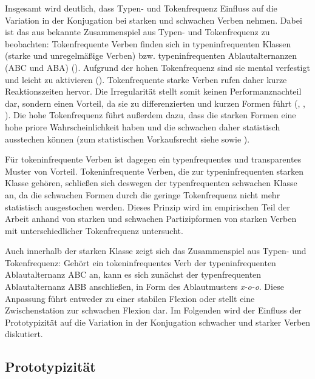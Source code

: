 Insgesamt wird deutlich, dass Typen- und Tokenfrequenz Einfluss auf die Variation in der Konjugation bei starken und schwachen Verben nehmen. Dabei ist das aus  bekannte Zusammenspiel aus Typen- und Tokenfrequenz zu beobachten: Tokenfrequente Verben finden sich in typeninfrequenten Klassen (starke und unregelmäßige Verben) bzw. typeninfrequenten Ablautalternanzen (ABC und ABA) (\cite[40--41]{Werner.1989}). Aufgrund der hohen Tokenfrequenz sind sie mental verfestigt und leicht zu aktivieren (\cite[380]{Bybee.1997}). Tokenfrequente starke Verben rufen daher kurze Reaktionszeiten hervor. Die Irregularität stellt somit keinen Performanznachteil dar, sondern einen Vorteil, da sie zu differenzierten und kurzen Formen führt (\cite[41--43]{Werner.1989}, \cite[256]{Nubling.2000}, \cite[174]{Nowak.2013}). Die hohe Tokenfrequenz führt außerdem dazu, dass die starken Formen eine hohe priore Wahrscheinlichkeit haben und die schwachen daher statistisch ausstechen können (zum statistischen Vorkaufsrecht siehe \cite[74--94]{Goldberg.2019} sowie ).

 
Für tokeninfrequente Verben ist dagegen ein typenfrequentes und transparentes Muster von Vorteil. Tokeninfrequente Verben, die zur typeninfrequenten starken Klasse gehören, schließen sich deswegen der typenfrequenten schwachen Klasse an, da die schwachen Formen durch die geringe Tokenfrequenz nicht mehr statistisch ausgestochen werden. Dieses Prinzip wird im empirischen Teil der Arbeit anhand von starken und schwachen Partizipformen von starken Verben mit unterschiedlicher Tokenfrequenz untersucht.


Auch innerhalb der starken Klasse zeigt sich das Zusammenspiel aus Typen- und Tokenfrequenz: Gehört ein tokeninfrequentes Verb der typeninfrequenten Ablautalternanz ABC an, kann es sich zunächst der typenfrequenten Ablaut\-alternanz ABB anschließen, in Form des Ablautmusters \textit{x-o-o}. Diese Anpassung führt entweder zu einer stabilen Flexion oder stellt eine Zwischenstation zur schwachen Flexion dar. Im Folgenden wird der Einfluss der Prototypizität auf die Variation in der Konjugation schwacher und starker Verben diskutiert.

\subsection{Prototypizität}
\label{protverb}

